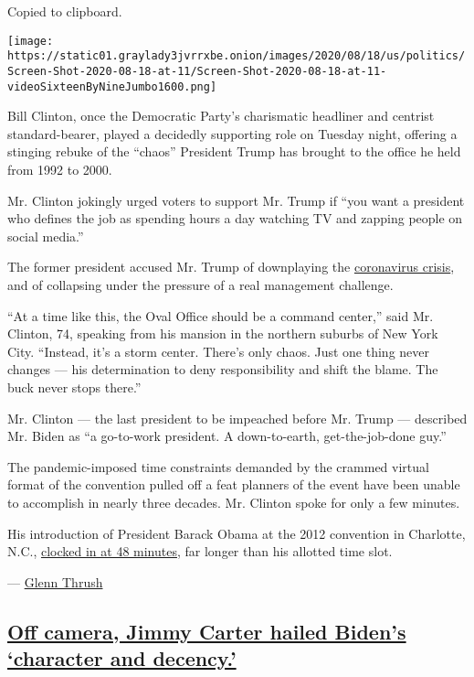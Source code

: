 Copied to clipboard.

\texttt{[image: https://static01.graylady3jvrrxbe.onion/images/2020/08/18/us/politics/Screen-Shot-2020-08-18-at-11/Screen-Shot-2020-08-18-at-11-videoSixteenByNineJumbo1600.png]}

Bill Clinton, once the Democratic Party's charismatic headliner and
centrist standard-bearer, played a decidedly supporting role on Tuesday
night, offering a stinging rebuke of the ``chaos'' President Trump has
brought to the office he held from 1992 to 2000.

Mr. Clinton jokingly urged voters to support Mr. Trump if ``you want a
president who defines the job as spending hours a day watching TV and
zapping people on social media.''

The former president accused Mr. Trump of downplaying the
\href{https://www.nytimes3xbfgragh.onion/news-event/coronavirus}{coronavirus
crisis}, and of collapsing under the pressure of a real management
challenge.

``At a time like this, the Oval Office should be a command center,''
said Mr. Clinton, 74, speaking from his mansion in the northern suburbs
of New York City. ``Instead, it's a storm center. There's only chaos.
Just one thing never changes --- his determination to deny
responsibility and shift the blame. The buck never stops there.''

Mr. Clinton --- the last president to be impeached before Mr. Trump ---
described Mr. Biden as ``a go-to-work president. A down-to-earth,
get-the-job-done guy.''

The pandemic-imposed time constraints demanded by the crammed virtual
format of the convention pulled off a feat planners of the event have
been unable to accomplish in nearly three decades. Mr. Clinton spoke for
only a few minutes.

His introduction of President Barack Obama at the 2012 convention in
Charlotte, N.C.,
\href{https://www.nytimes3xbfgragh.onion/2020/08/18/us/politics/bill-clinton-convention.html}{clocked
in at 48 minutes}, far longer than his allotted time slot.

--- \href{https://www.nytimes3xbfgragh.onion/by/glenn-thrush}{Glenn
Thrush}

\hypertarget{off-camera-jimmy-carter-hailed-bidens-character-and-decency}{%
\subsection{\texorpdfstring{\protect\hyperlink{off-camera-jimmy-carter-hailed-bidens-character-and-decency}{Off
camera, Jimmy Carter hailed Biden's `character and
decency.'}}{Off camera, Jimmy Carter hailed Biden's `character and decency.'}}\label{off-camera-jimmy-carter-hailed-bidens-character-and-decency}}

